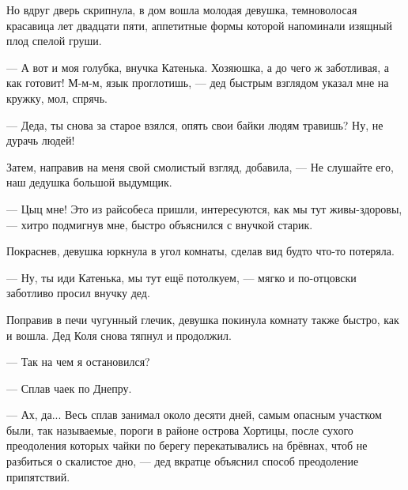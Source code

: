 Но вдруг дверь скрипнула, в дом вошла молодая девушка, темноволосая красавица
лет двадцати пяти, аппетитные формы которой напоминали изящный плод спелой
груши.

— А вот и моя голубка, внучка Катенька. Хозяюшка, а до чего ж заботливая, а как
готовит! М-м-м, язык проглотишь, — дед быстрым взглядом указал мне на кружку,
мол, спрячь.

— Деда, ты снова за старое взялся, опять свои байки людям травишь? Ну, не
дурачь людей!

Затем, направив на меня свой смолистый взгляд, добавила, — Не слушайте его, наш
дедушка большой выдумщик.

— Цыц мне! Это из райсобеса пришли, интересуются, как мы тут живы-здоровы, —
хитро подмигнув мне, быстро объяснился с внучкой старик.

Покраснев, девушка юркнула в угол комнаты, сделав вид будто что-то потеряла.

— Ну, ты иди Катенька, мы тут ещё потолкуем,  — мягко и по-отцовски заботливо
просил внучку дед.

Поправив в печи чугунный глечик, девушка покинула комнату также быстро, как и
вошла. Дед Коля снова тяпнул и продолжил.

—  Так на чем я остановился?

— Сплав чаек по Днепру.

— Ах, да... Весь сплав занимал около десяти дней, самым опасным участком были,
так называемые, пороги в районе острова Хортицы, после сухого преодоления
которых чайки по берегу перекатывались на брёвнах, чтоб не разбиться о
скалистое дно, — дед вкратце объяснил способ преодоление припятствий.

